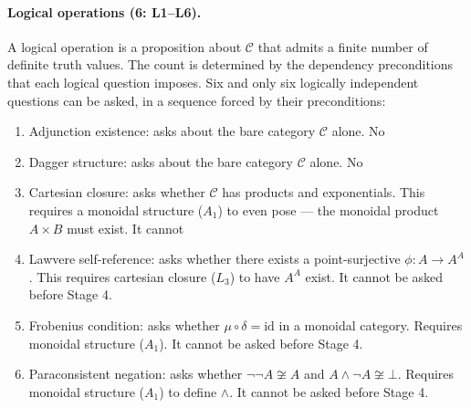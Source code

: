 \documentclass[12pt,a4paper]{article}
\begin{document}
\paragraph{Logical operations (6: L1--L6).}
A logical operation is a proposition about $\mathcal{C}$ that admits a finite number of definite truth values. The
count is determined by the dependency preconditions that each logical question imposes. Six and only six logically
independent questions can be asked, in a sequence forced by their preconditions:

\begin{enumerate}[nosep, leftmargin=2em]
 \item[\textbf{L1}] Adjunction existence: asks about the bare category $\mathcal{C}$ alone. No
 \item[\textbf{L2}] Dagger structure: asks about the bare category $\mathcal{C}$ alone. No
 \item[\textbf{L3}] Cartesian closure: asks whether $\mathcal{C}$ has products and exponentials. This requires a
monoidal structure ($A_1$) to even pose --- the monoidal product $A \times B$ must exist. It cannot
 \item[\textbf{L4}] Lawvere self-reference: asks whether there exists a point-surjective $\phi: A
 \to A^A$. This
requires cartesian closure ($L_3$) to have $A^A$ exist. It cannot be asked before Stage 4.
 \item[\textbf{L5}] Frobenius condition: asks whether $\mu\circ\delta = \text{id}$ in a monoidal category. Requires
monoidal structure ($A_1$). It cannot be asked before Stage 4.
 \item[\textbf{L6}] Paraconsistent negation: asks whether $\neg\neg A \not\cong A$ and $A \wedge
 \neg A \not\cong
\bot$. Requires monoidal structure ($A_1$) to define $\wedge$. It cannot be asked before Stage 4.
\end{enumerate}
\end{document}
